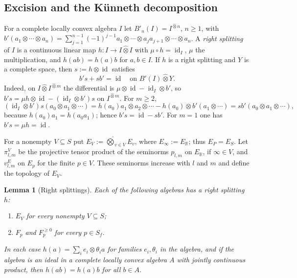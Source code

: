 \documentclass[11pt]{amsart}
\newtheorem{lemma}[theorem]{Lemma}
\theoremstyle{definition}
\theoremstyle{remark}
\newcommand{\R}{\mathbb R}
\newcommand{\id}{\operatorname{id}}
\begin{document}
\subsection{Excision and the K\"unneth decomposition}

For a complete locally convex algebra $I$ let $B'_n(I)=I^{\widehat\otimes n}$,
$n\ge1$, with
$b'(a_1\otimes\cdots\otimes a_n)=\sum_{j=1}^{n-1}(-1)^{j-1}a_1\otimes\cdots\otimes
a_ja_{j+1}\otimes\cdots\otimes a_n$.  A \emph{right splitting} of $I$ is a
continuous linear map $h:I\to I\widehat\otimes I$ with $\mu\circ h=\id_I$,
$\mu$ the multiplication, and $h(ab)=h(a)b$ for $a,b\in I$.  If $h$ is a right
splitting and $Y$ is a complete space, then $s:=h\otimes\id$ satisfies
\begin{equation}\label{eq:barcontraction}
b's+sb'=\id\quad\text{on }B'(I)\widehat\otimes Y .
\end{equation}
Indeed, on $I\widehat\otimes I^{\widehat\otimes m}$ the differential is
$\mu\otimes\id-\id_I\otimes b'$, so $b's=\mu h\otimes\id-(\id_I\otimes b')s$ on
$I^{\widehat\otimes m}$.  For $m\ge2$,
\[
(\id_I\otimes b')s(a_0\otimes a_1\otimes\cdots)=h(a_0)a_1\otimes a_2\otimes\cdots
-h(a_0)\otimes b'(a_1\otimes\cdots)=sb'(a_0\otimes a_1\otimes\cdots),
\]
because $h(a_0)a_1=h(a_0a_1)$; hence $b's=\id-sb'$.  For $m=1$ one has
$b's=\mu h=\id$.

For a nonempty $V\subseteq S$ put $E_V:=\widehat\bigotimes_{v\in V}E_v$,
where $E_{\infty}:=E_{\R}$; thus $E_P=E_S$.  Let $\pi^{V}_{l,m}$ be the
projective tensor product of the seminorms $p_{l,m}$ on $E_{\R}$, if
$\infty\in V$, and $v^{E}_{l,m}$ on $E_p$ for the finite $p\in V$.  These
seminorms increase with $l$ and $m$ and define the topology of $E_V$.

\begin{lemma}[Right splittings]\label{lem:hunital}
Each of the following algebras has a right splitting $h$:
\begin{enumerate}
\item[(i)] $E_V$ for every nonempty $V\subseteq S$;
\item[(ii)] $F_p$ and $F_p^{\ge0}$ for every $p\in S_f$.
\end{enumerate}
In each case $h(a)=\sum_ie_i\otimes\theta_ia$ for families $e_i,\theta_i$ in
the algebra, and if the algebra is an ideal in a complete locally convex
algebra $A$ with jointly continuous product, then $h(ab)=h(a)b$ for all
$b\in A$.
\end{lemma}
\end{document}
